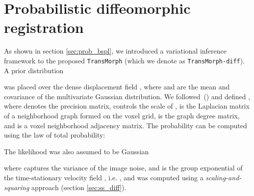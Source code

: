 \documentclass[times,twocolumn,final]{elsarticle}
\begin{document}
\section{Probabilistic diffeomorphic registration}
\label{sec:prob_diff}
As shown in section \ref{sec:prob_bspl}, we introduced a variational inference framework to the proposed \texttt{TransMorph} (which we denote as \texttt{TransMorph-diff}). A prior distribution 
\begin{linenomath}

\end{linenomath} was placed over the dense displacement field , where  and  are the mean and covariance of the multivariate Gaussian distribution. We followed~(\cite{dalca2019unsupervised}) and defined , where  denotes the precision matrix,  controls the scale of ,  is the Laplacian matrix of a neighborhood graph formed on the voxel grid,  is the graph degree matrix, and  is a voxel neighborhood adjacency matrix. The probability  can be computed using the law of total probability:
\begin{linenomath}

\end{linenomath}
The likelihood  was also assumed to be Gaussian
\begin{linenomath}

\end{linenomath}
where  captures the variance of the image noise, and  is the group exponential of the time-stationary velocity field , i.e. , and was computed using a \textit{scaling-and-squaring} approach (section \ref{sec:ss_diff}). 
\end{document}

